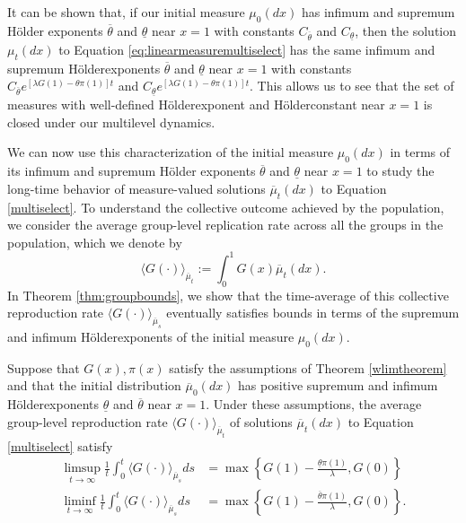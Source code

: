 \documentclass[11pt]{article}
\numberwithin{equation}{section}
\newcommand{\ds}{\displaystyle}
\newcommand{\ol}{\overline}
\newcommand{\holder}{H{\"o}lder\:}
\begin{document}
{\begin{remark}
It can be shown that, if our initial measure $\mu_0(dx)$ has infimum and supremum H{\"o}lder exponents $\overline{\theta}$ and $\underline{\theta}$ near $x=1$ with constants $C_{\overline{\theta}}$ and $C_{\underline{\theta}}$, then the solution $\mu_t(dx)$ to Equation \eqref{eq:linearmeasuremultiselect} has the same infimum and supremum \holder exponents $\overline{\theta}$ and $\underline{\theta}$ near $x=1$ with constants $C_{\overline{\theta}} e^{\left[\lambda G(1) - \theta \pi(1) \right]t}$ and $C_{\underline{\theta}} e^{\left[\lambda G(1) - \theta \pi(1) \right]t}$. This allows us to see that the set of measures with well-defined \holder exponent and \holder constant near $x=1$ is closed under our multilevel dynamics.
\end{remark}


We can now use this characterization of the initial measure $\mu_0(dx)$ in terms of its infimum and supremum H{\"o}lder exponents $\overline{\theta}$ and $\underline{\theta}$ near $x=1$ to study the long-time behavior of measure-valued solutions $\ol{\mu}_t(dx)$ to Equation \eqref{multiselect}. To understand the collective outcome achieved by the population, we consider the average group-level replication rate across all the groups in the population, which we denote by
\begin{equation} \label{eq:mutaverage}
    \langle G(\cdot) \rangle_{ \ol{\mu}_t} := \int_0^1 G(x) \ol{\mu}_t(dx).
\end{equation}
In Theorem \ref{thm:groupbounds}, we show that the time-average of this collective reproduction rate $\langle G(\cdot) \rangle_{\ol{\mu}_s}$ eventually satisfies bounds in terms of the supremum and infimum \holder exponents of the initial measure $\mu_0(dx)$.

\begin{theorem} \label{thm:groupbounds}
Suppose that $G(x), \pi(x)$ satisfy the assumptions of Theorem \ref{wlimtheorem} and that the initial distribution $\overline{\mu}_0(dx)$ has positive supremum and infimum \holder exponents $\underline{\theta}$ and $\overline{\theta}$ near $x=1$. Under these assumptions, the average group-level reproduction rate $\langle G(\cdot) \rangle_{\ol{\mu}_t}$ of solutions $\ol{\mu}_t(dx)$ to Equation \eqref{multiselect} satisfy
\begin{subequations} \label{eq:groupboundslims}
\begin{align}
    \ds\limsup_{t \to \infty} \frac{1}{t} \int_0^t \langle G(\cdot) \rangle_{\ol{\mu}_s} ds &= \max\left\{  G(1) - \frac{\underline{\theta} \pi(1)}{\lambda}, G(0) \right\} \label{eq:groupupperbound} \\ 
     \ds\liminf_{t \to \infty} \frac{1}{t} \int_0^t \langle G(\cdot) \rangle_{\ol{\mu}_s} ds &= \max\left\{G(1) - \frac{\overline{\theta} \pi(1)}{\lambda}, G(0) \right\}  \label{eq:grouplowerbound}.
\end{align}
\end{subequations}
\end{theorem}

}
\end{document}

